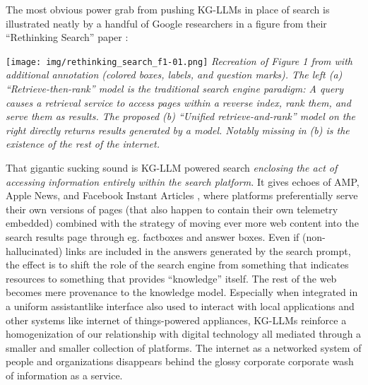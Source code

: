 The most obvious power grab from pushing KG-LLMs in place of search is
illustrated neatly by a handful of Google researchers in a figure from
their ``Rethinking Search'' paper \cite{metzlerRethinkingSearchMaking2021} :

\texttt{[image: img/rethinking\_search\_f1-01.png]} \emph{Recreation of
Figure 1 from \cite{metzlerRethinkingSearchMaking2021}  with
additional annotation (colored boxes, labels, and question marks). The
left (a) ``Retrieve-then-rank'' model is the traditional search engine
paradigm: A query causes a retrieval service to access pages within a
reverse index, rank them, and serve them as results. The proposed (b)
``Unified retrieve-and-rank'' model on the right directly returns
results generated by a model. Notably missing in (b) is the existence of
the rest of the internet.}

That gigantic sucking sound is KG-LLM powered search \emph{enclosing the
act of accessing information entirely within the search platform.} It
gives echoes of AMP, Apple News, and Facebook Instant Articles \cite{ampletterLetterGoogleAMP2018, bohnGooglePlanMake2018} , where
platforms preferentially serve their own versions of pages (that also
happen to contain their own telemetry embedded) combined with the
strategy of moving ever more web content into the search results page
through eg. factboxes and answer boxes. Even if (non-hallucinated) links are included
in the answers generated by the search prompt, the effect is to shift
the role of the search engine from something that indicates resources to
something that provides ``knowledge'' itself. The rest of the web
becomes mere provenance to the knowledge model. Especially when
integrated in a uniform assistantlike interface also used to interact
with local applications and other systems like internet of
things-powered appliances, KG-LLMs reinforce a homogenization of our
relationship with digital technology all mediated through a smaller and
smaller collection of platforms. The internet as a networked system of
people and organizations disappears behind the glossy corporate
corporate wash of information as a service.

